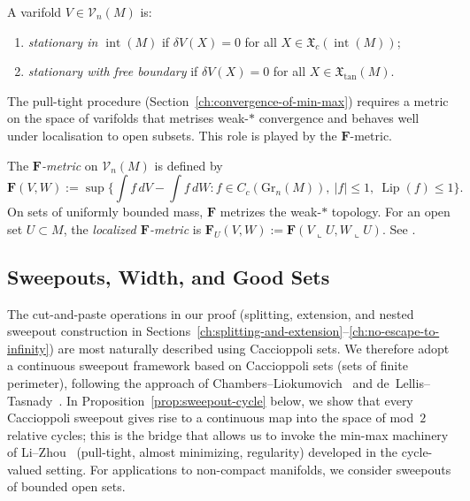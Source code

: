 \begin{definition}[Stationarity]\label{def:stationary}
A varifold $V \in \mathcal{V}_n(M)$ is:
\begin{enumerate}[label=\textup{(\roman*)}]
    \item \emph{stationary in $\operatorname{int}(M)$} if $\delta V(X) = 0$ for all $X \in \mathfrak{X}_c(\operatorname{int}(M))$;
    \item \emph{stationary with free boundary} if $\delta V(X) = 0$ for all $X \in \mathfrak{X}_{\mathrm{tan}}(M)$.
\end{enumerate}
\end{definition}

The pull-tight procedure (Section~\ref{ch:convergence-of-min-max}) requires a metric on the space of varifolds that metrises weak-$*$ convergence and behaves well under localisation to open subsets. This role is played by the $\mathbf{F}$-metric.

\begin{definition}\label{def:F-metric}
The \emph{$\mathbf{F}$-metric} on $\mathcal{V}_n(M)$ is defined by
\[
\mathbf{F}(V, W) := \sup\biggl\{\int f \, dV - \int f \, dW : f \in C_c(\mathrm{Gr}_n(M)),\ |f| \leq 1,\ \operatorname{Lip}(f) \leq 1\biggr\}.
\]
On sets of uniformly bounded mass, $\mathbf{F}$ metrizes the weak-$*$ topology. For an open set $U \subset M$, the \emph{localized $\mathbf{F}$-metric} is $\mathbf{F}_U(V, W) := \mathbf{F}(V \llcorner U, W \llcorner U)$. See \cite[Section~2]{LZ17}.
\end{definition}

\subsection{Sweepouts, Width, and Good Sets}\label{sec:sweepouts}

The cut-and-paste operations in our proof (splitting, extension, and nested sweepout construction in Sections~\ref{ch:splitting-and-extension}--\ref{ch:no-escape-to-infinity}) are most naturally described using Caccioppoli sets. We therefore adopt a continuous sweepout framework based on Caccioppoli sets (sets of finite perimeter), following the approach of Chambers--Liokumovich~\cite{CL20} and de~Lellis--Tasnady~\cite{DLT13}. In Proposition~\ref{prop:sweepout-cycle} below, we show that every Caccioppoli sweepout gives rise to a continuous map into the space of mod~$2$ relative cycles; this is the bridge that allows us to invoke the min-max machinery of Li--Zhou~\cite{LZ17} (pull-tight, almost minimizing, regularity) developed in the cycle-valued setting. For applications to non-compact manifolds, we consider sweepouts of bounded open sets.

